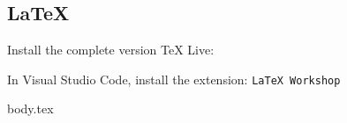 \subsection{LaTeX}

Install the complete version TeX Live:


In Visual Studio Code, install the extension: \texttt{LaTeX Workshop}

\ifdefined\latexWorkshop
{body.tex}
\fi